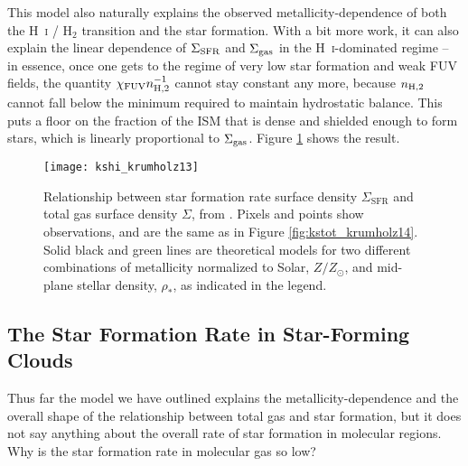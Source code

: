 This model also naturally explains the observed metallicity-dependence of both the H~\textsc{i} / H$_2$ transition and the star formation. With a bit more work, it can also explain the linear dependence of $\Sigma_{\rm SFR}$ and $\Sigma_{\rm gas}$ in the H~\textsc{i}-dominated regime -- in essence, once one gets to the regime of very low star formation and weak FUV fields, the quantity $\chi_{\rm FUV} n_{\rm H,2}^{-1}$ cannot stay constant any more, because $n_{\rm H,2}$ cannot fall below the minimum required to maintain hydrostatic balance. This puts a floor on the fraction of the ISM that is dense and shielded enough to form stars, which is linearly proportional to $\Sigma_{\rm gas}$. Figure \ref{fig:kshi_krumholz13} shows the result.

\begin{figure}
\texttt{[image: kshi\_krumholz13]}
\caption[Theoretical model for metallicity-dependence of the star formation rate]{
\label{fig:kshi_krumholz13}
Relationship between star formation rate surface density $\Sigma_{\mathrm{SFR}}$ and total gas surface density $\Sigma$, from \citet{krumholz13c}. Pixels and points show observations, and are the same as in Figure \ref{fig:kstot_krumholz14}. Solid black and green lines are theoretical models for two different combinations of metallicity normalized to Solar, $Z/Z_\odot$, and mid-plane stellar density, $\rho_*$, as indicated in the legend.
}
\end{figure}

\subsection{The Star Formation Rate in Star-Forming Clouds}

Thus far the model we have outlined explains the metallicity-dependence and the overall shape of the relationship between total gas and star formation, but it does not say anything about the overall rate of star formation in molecular regions. Why is the star formation rate in molecular gas so low?

